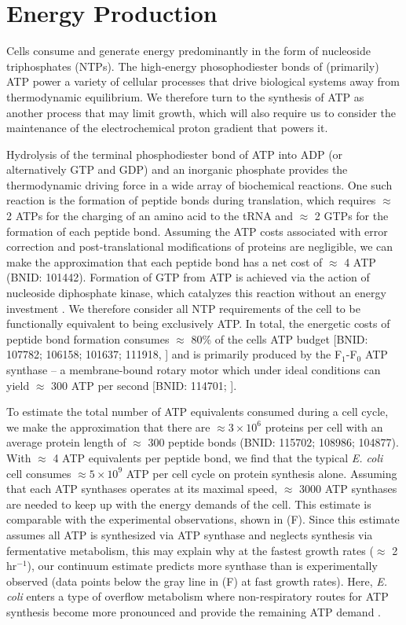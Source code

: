 \section{Energy Production}
Cells consume and generate energy predominantly in the form of nucleoside
triphosphates (NTPs). The high-energy phosophodiester bonds of
(primarily) ATP power a variety of cellular processes that drive biological
systems away from thermodynamic equilibrium. We therefore turn to the synthesis
of ATP as another process that may limit growth, which will also require us
to consider the maintenance of the electrochemical proton gradient that powers
it.

Hydrolysis of the terminal phosphodiester bond of ATP into ADP (or
alternatively GTP and GDP) and an inorganic phosphate provides the
thermodynamic driving force in a wide array of biochemical reactions. One
such reaction is the formation of peptide bonds during translation, which
requires $\approx$ 2 ATPs for the charging of an amino acid to the tRNA and
$\approx$ 2 GTPs for the formation of each peptide bond. Assuming the ATP
costs associated with error correction and post-translational modifications
of proteins are negligible, we can make the approximation that each peptide
bond has a net cost of $\approx$ 4 ATP (BNID: 101442).
Formation of GTP from ATP is achieved via the action of nucleoside
diphosphate kinase, which catalyzes this reaction without an energy
investment \citep{lascu2000}. We therefore consider all NTP requirements of
the cell to be functionally equivalent to being exclusively ATP. In total,
the energetic costs of peptide bond formation consumes $\approx$ 80\% of the
cells ATP budget [BNID: 107782; 106158; 101637; 111918,
\cite{lynch2015,stouthamer1973}] and is primarily produced by the
F$_1$-F$_0$ ATP synthase -- a membrane-bound rotary motor which under ideal
conditions can yield $\approx$ 300 ATP per second [BNID: 114701;
\cite{weber2003}].

To estimate the total number of ATP equivalents consumed during a cell cycle, we
make the approximation that there are $\approx 3\times10^6$ proteins per cell
with an average protein length of $\approx$ 300 peptide bonds (BNID: 115702;
108986; 104877). With $\approx$ 4 ATP equivalents per peptide bond, we find that
the typical \textit{E. coli} cell consumes $\approx 5 \times 10^9$ ATP per cell
cycle on protein synthesis alone. Assuming that each ATP synthases operates at
its maximal speed, $\approx$ 3000 ATP synthases are needed to keep up with the
energy demands of the cell. This estimate is comparable with the experimental
observations, shown in (F). Since this estimate
assumes all ATP is synthesized via ATP synthase and neglects synthesis via
fermentative metabolism, this may explain why at the fastest growth rates
($\approx$ 2 hr$^{-1}$), our continuum estimate predicts more synthase than is
experimentally observed (data points below the gray line in
(F) at fast growth rates). Here, \textit{E. coli} enters
a type of overflow metabolism where non-respiratory routes for ATP synthesis
become more pronounced and provide the remaining ATP demand \citep{molenaar2009,
zhuang2011, szenk2017} .

